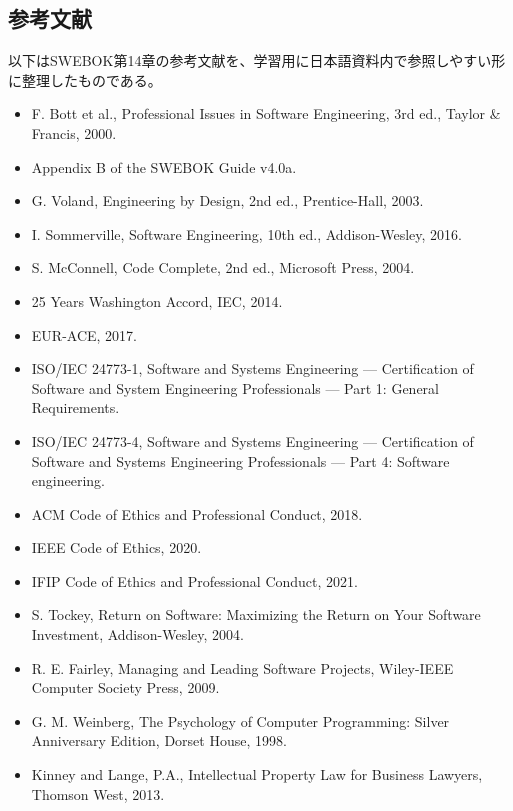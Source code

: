 \documentclass[a4paper,11pt]{ltjsarticle}
\numberwithin{figure}{section}
\numberwithin{table}{section}
\begin{document}
\subsection*{参考文献}


以下はSWEBOK第14章の参考文献を、学習用に日本語資料内で参照しやすい形に整理したものである。

\begin{itemize}[leftmargin=2em]

\item F. Bott et al., Professional Issues in Software Engineering, 3rd ed., Taylor \& Francis, 2000.

\item Appendix B of the SWEBOK Guide v4.0a.

\item G. Voland, Engineering by Design, 2nd ed., Prentice-Hall, 2003.

\item I. Sommerville, Software Engineering, 10th ed., Addison-Wesley, 2016.

\item S. McConnell, Code Complete, 2nd ed., Microsoft Press, 2004.

\item 25 Years Washington Accord, IEC, 2014.

\item EUR-ACE, 2017.

\item ISO/IEC 24773-1, Software and Systems Engineering — Certification of Software and System Engineering Professionals — Part 1: General Requirements.

\item ISO/IEC 24773-4, Software and Systems Engineering — Certification of Software and Systems Engineering Professionals — Part 4: Software engineering.

\item ACM Code of Ethics and Professional Conduct, 2018.

\item IEEE Code of Ethics, 2020.

\item IFIP Code of Ethics and Professional Conduct, 2021.

\item S. Tockey, Return on Software: Maximizing the Return on Your Software Investment, Addison-Wesley, 2004.

\item R. E. Fairley, Managing and Leading Software Projects, Wiley-IEEE Computer Society Press, 2009.

\item G. M. Weinberg, The Psychology of Computer Programming: Silver Anniversary Edition, Dorset House, 1998.

\item Kinney and Lange, P.A., Intellectual Property Law for Business Lawyers, Thomson West, 2013.

\end{itemize}
\end{document}
